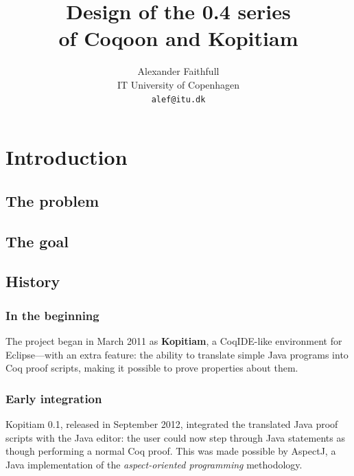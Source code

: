 \documentclass{article}
\author{Alexander Faithfull\\IT University of Copenhagen\\\texttt{alef@itu.dk}}
\title{Design of the 0.4 series\\of Coqoon and Kopitiam}
\newcommand{\fdef}[1]{\textit{#1}}
\newcommand{\name}[1]{\textbf{#1}}
\begin{document}
\maketitle


\tableofcontents

\pagebreak

\section{Introduction}

\subsection{The problem}

\subsection{The goal}

\subsection{History}

\subsubsection{In the beginning}

The project began in March 2011 as \name{Kopitiam}, a CoqIDE-like environment
for Eclipse---with an extra feature: the ability to translate simple Java
programs into Coq proof scripts, making it possible to prove properties about
them.

\subsubsection{Early integration}

Kopitiam 0.1, released in September 2012, integrated the translated Java proof
scripts with the Java editor: the user could now step through Java statements
as though performing a normal Coq proof. This was made possible by AspectJ, a
Java implementation of the \fdef{aspect-oriented programming} methodology.
\end{document}
